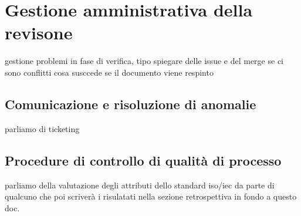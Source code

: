 \section{Gestione amministrativa della revisone}
gestione problemi in fase di verifica, tipo spiegare delle issue e del merge se ci sono conflitti cosa susccede se il documento viene respinto
\subsection{Comunicazione e risoluzione di anomalie}
parliamo di ticketing
\subsection{Procedure di controllo di qualità di processo}
parliamo della valutazione degli attributi dello standard iso/iec da parte di qualcuno che poi scriverà i risulatati nella sezione retrospettiva in fondo a questo doc.